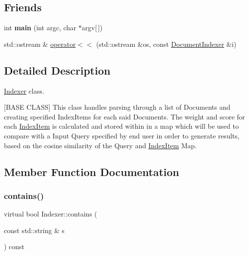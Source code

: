 \subsection*{Friends}
\begin{DoxyCompactItemize}
\item 
\mbox{\label{class_indexer_a0ddf1224851353fc92bfbff6f499fa97}} 
int {\bfseries main} (int argc, char $\ast$argv\mbox{[}$\,$\mbox{]})
\item 
std\+::ostream \& \hyperlink{class_indexer_a09373f25959741150437b95f15ae11e2}{operator$<$$<$} (std\+::ostream \&os, const \hyperlink{class_document_indexer}{Document\+Indexer} \&i)
\end{DoxyCompactItemize}


\subsection{Detailed Description}
\hyperlink{class_indexer}{Indexer} class. 

\mbox{[}B\+A\+SE C\+L\+A\+SS\mbox{]} This class handles parsing through a list of Documents and creating specified Index\+Items for each said Documents. The weight and score for each \hyperlink{class_index_item}{Index\+Item} is calculated and stored within in a map which will be used to compare with a Input Query specified by end user in order to generate results, based on the cosine similarity of the Query and \hyperlink{class_index_item}{Index\+Item} Map. 

\subsection{Member Function Documentation}
\mbox{\label{class_indexer_abb847ff86be1ec9265fb53a5ac6f7008}} 
\subsubsection{\texorpdfstring{contains()}{contains()}}
{\footnotesize\ttfamily virtual bool Indexer\+::contains (\begin{DoxyParamCaption}\item[{const std\+::string \&}]{s }\end{DoxyParamCaption}) const\hspace{0.3cm}{\ttfamily [pure virtual]}}




